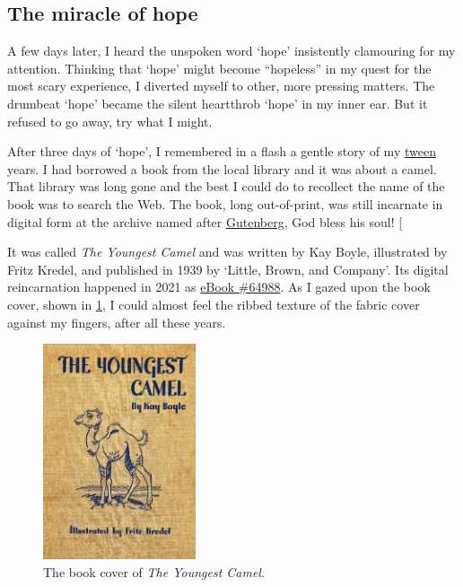 \documentclass[
  a4paper,
]{article}
\begin{document}
\subsection{The miracle of hope}\label{the-miracle-of-hope}

A few days later, I heard the unspoken word `hope' insistently
clamouring for my attention. Thinking that `hope' might become
``hopeless'' in my quest for the most scary experience, I diverted
myself to other, more pressing matters. The drumbeat `hope' became the
silent heartthrob `hope' in my inner ear. But it refused to go away, try
what I might.

After three days of `hope', I remembered in a flash a gentle story of my
\href{https://www.thefreedictionary.com/tween}{tween} years. I had
borrowed a book from the local library and it was about a camel. That
library was long gone and the best I could do to recollect the name of
the book was to search the Web. The book, long out-of-print, was still
incarnate in digital form at the archive named after
\href{https://www.newworldencyclopedia.org/entry/Johannes_Gutenberg}{Gutenberg},
God bless his soul! {[}\citeproc{ref-boyle1939}{1}{]}

It was called \emph{The Youngest Camel} and was written by Kay Boyle,
illustrated by Fritz Kredel, and published in 1939 by `Little, Brown,
and Company'. Its digital reincarnation happened in 2021 as
\href{https://www.gutenberg.org/files/64988/64988-h/64988-h.htm}{eBook
\#64988}. As I gazed upon the book cover, shown in \cref{fig:camel}, I
could almost feel the ribbed texture of the fabric cover against my
fingers, after all these years.

\begin{figure}
\centering
\includegraphics[width=0.4\textwidth,height=\textheight]{images/camel.jpg}
\caption{The book cover of \emph{The Youngest Camel}.}\label{fig:camel}
\end{figure}
\end{document}
